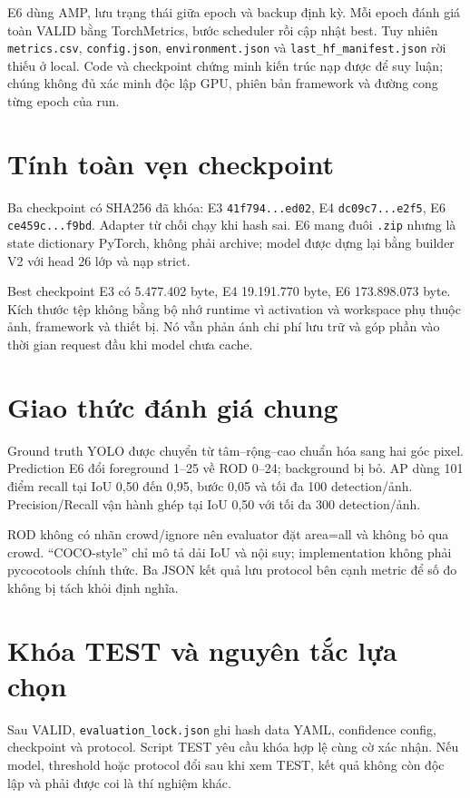 \documentclass[12pt,a4paper,oneside]{report}
\begin{document}
E6 dùng AMP, lưu trạng thái giữa epoch và backup định kỳ. Mỗi epoch đánh giá toàn VALID bằng TorchMetrics, bước scheduler rồi cập nhật best. Tuy nhiên \texttt{metrics.csv}, \texttt{config.json}, \texttt{environment.json} và \texttt{last\_hf\_manifest.json} rời thiếu ở local. Code và checkpoint chứng minh kiến trúc nạp được để suy luận; chúng không đủ xác minh độc lập GPU, phiên bản framework và đường cong từng epoch của run.

\section{Tính toàn vẹn checkpoint}
Ba checkpoint có SHA256 đã khóa: E3 \texttt{41f794...ed02}, E4 \texttt{dc09c7...e2f5}, E6 \texttt{ce459c...f9bd}. Adapter từ chối chạy khi hash sai. E6 mang đuôi \texttt{.zip} nhưng là state dictionary PyTorch, không phải archive; model được dựng lại bằng builder V2 với head 26 lớp và nạp strict.

Best checkpoint E3 có 5.477.402 byte, E4 19.191.770 byte, E6 173.898.073 byte. Kích thước tệp không bằng bộ nhớ runtime vì activation và workspace phụ thuộc ảnh, framework và thiết bị. Nó vẫn phản ánh chi phí lưu trữ và góp phần vào thời gian request đầu khi model chưa cache.

\section{Giao thức đánh giá chung}
Ground truth YOLO được chuyển từ tâm--rộng--cao chuẩn hóa sang hai góc pixel. Prediction E6 đổi foreground 1--25 về ROD 0--24; background bị bỏ. AP dùng 101 điểm recall tại IoU 0,50 đến 0,95, bước 0,05 và tối đa 100 detection/ảnh. Precision/Recall vận hành ghép tại IoU 0,50 với tối đa 300 detection/ảnh.

ROD không có nhãn crowd/ignore nên evaluator đặt area=all và không bỏ qua crowd. “COCO-style” chỉ mô tả dải IoU và nội suy; implementation không phải pycocotools chính thức. Ba JSON kết quả lưu protocol bên cạnh metric để số đo không bị tách khỏi định nghĩa.

\section{Khóa TEST và nguyên tắc lựa chọn}
Sau VALID, \texttt{evaluation\_lock.json} ghi hash data YAML, confidence config, checkpoint và protocol. Script TEST yêu cầu khóa hợp lệ cùng cờ xác nhận. Nếu model, threshold hoặc protocol đổi sau khi xem TEST, kết quả không còn độc lập và phải được coi là thí nghiệm khác.
\end{document}
